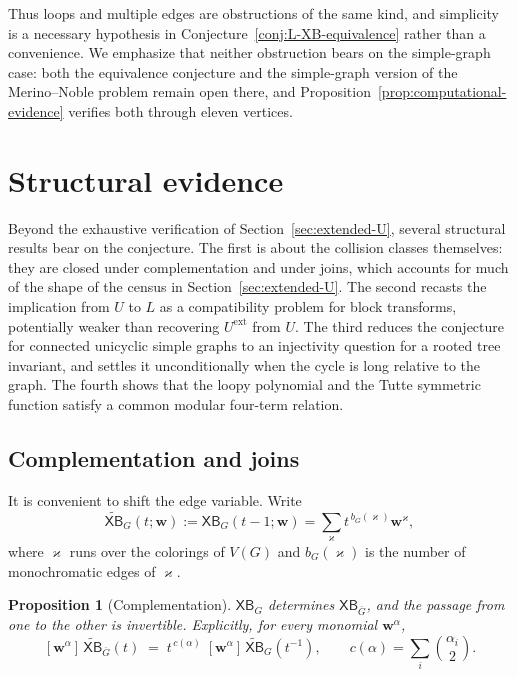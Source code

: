\documentclass[11pt]{article}
\theoremstyle{plain}
\newtheorem{proposition}[theorem]{Proposition}
\theoremstyle{definition}
\newcommand{\bw}{\mathbf{w}}
\newcommand{\XB}{\mathsf{XB}} %
\newcommand{\kp}{\varkappa}
\newcommand{\ext}{\mathrm{ext}}
\numberwithin{equation}{section}
\begin{document}
Thus loops and multiple edges are obstructions of the same kind, and simplicity is a necessary hypothesis in
Conjecture~\ref{conj:L-XB-equivalence} rather than a convenience.
We emphasize that neither obstruction bears on the simple-graph case: both the equivalence conjecture
and the simple-graph version of the Merino--Noble problem remain open there, and
Proposition~\ref{prop:computational-evidence} verifies both through eleven vertices.

\section{Structural evidence}
\label{sec:structural-evidence}
Beyond the exhaustive verification of Section~\ref{sec:extended-U},
several structural results bear on the conjecture.
The first is about the collision classes themselves: they are closed under complementation and
under joins, which accounts for much of the shape of the census in Section~\ref{sec:extended-U}.
The second recasts the implication from $U$ to $L$
as a compatibility problem for block transforms, potentially weaker than recovering $U^\ext$ from $U$.
The third reduces the conjecture for connected unicyclic simple graphs to an injectivity
question for a rooted tree invariant, and settles it unconditionally when the cycle is long relative
to the graph.
The fourth shows that the loopy polynomial and the Tutte symmetric function satisfy
a common modular four-term relation.

\subsection{Complementation and joins}
\label{subsec:complementation}
It is convenient to shift the edge variable.
Write
\begin{equation}\label{eq:XB-tilde}
  \widetilde{\XB}_G(t;\bw):=\XB_G(t-1;\bw) = \sum_{\kp}t^{\,b_G(\kp)}\bw^{\kp},
\end{equation}
where $\kp$ runs over the colorings of $V(G)$ and $b_G(\kp)$ is the number of monochromatic edges of $\kp$.

\begin{proposition}[Complementation]\label{prop:XB-complement}
$\XB_G$ determines $\XB_{\overline G}$, and the passage from one to the other is
invertible.  Explicitly, for every monomial $\bw^{\alpha}$,
\[
   [\bw^{\alpha}]\,\widetilde{\XB}_{\overline G}(t)
   \;=\;
   t^{\,c(\alpha)}\;[\bw^{\alpha}]\,\widetilde{\XB}_{G}(t^{-1}),
   \qquad
   c(\alpha)=\sum_i\binom{\alpha_i}{2}.
\]
\end{proposition}
\end{document}
